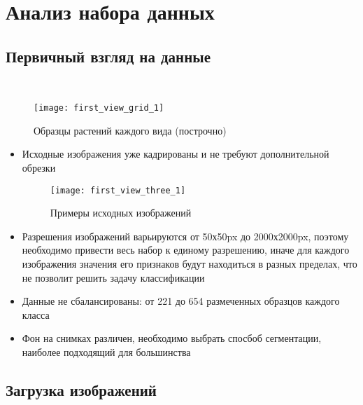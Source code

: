\documentclass[12pt]{article}
\begin{document}
\section{Анализ набора данных}
\subsection{Первичный взгляд на данные}

\\

\begin{figure}[h]
	\centering
	\texttt{[image: first\_view\_grid\_1]}
	\caption{Образцы растений каждого вида (построчно)}
	\label{fig_1}
\end{figure}

\begin{itemize}
	\item {Исходные изображения уже кадрированы и не требуют дополнительной обрезки 
	\begin{figure}[h!]
		\centering
		\texttt{[image: first\_view\_three\_1]}
		\caption{Примеры исходных изображений}
		\label{fig_2}
	\end{figure}
	}
	\item Разрешения изображений варьируются от 50х50px до 2000х2000px, поэтому необходимо привести весь набор к единому разрешению, иначе для каждого изображения значения его признаков будут находиться в разных пределах, что не позволит решить задачу классификации
	\item Данные не сбалансированы: от 221 до 654 размеченных образцов каждого класса
	\item Фон на снимках различен, необходимо выбрать спосбоб сегментации, наиболее подходящий для большинства
\end{itemize}

\subsection{Загрузка изображений}
\end{document}
